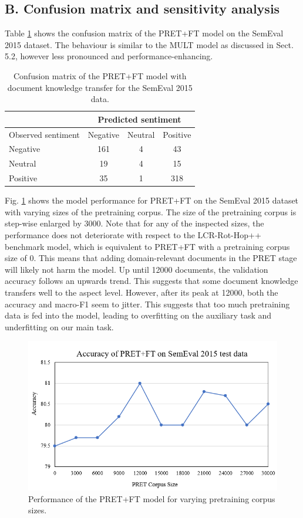 \subsection*{B. Confusion matrix and sensitivity analysis}
\renewcommand{\thefigure}{B\arabic{figure}}
\setcounter{figure}{0}
\renewcommand{\thetable}{B\arabic{table}}
\setcounter{table}{0}

Table \ref{tab:confusion matrix:pret} shows the confusion matrix of the PRET+FT model on the SemEval 2015 dataset. The behaviour is similar to the MULT model as discussed in Sect. 5.2, however less pronounced and performance-enhancing.
\begin{table}[h!]
\caption{Confusion matrix of the PRET+FT model with document knowledge transfer for the SemEval 2015 data.}
\label{tab:confusion matrix:pret}
\setlength{\tabcolsep}{28.3pt}
\begin{tabular}{@{}lccc@{}}
\toprule
                   & \multicolumn{3}{c}{Predicted sentiment} \\ \midrule
 Observed sentiment & Negative     & Neutral    & Positive    \\ \midrule
 Negative           & 161          & 4          & 43          \\
 Neutral            & 19           & 4          & 15          \\
 Positive           & 35           & 1          & 318         \\ \bottomrule
 \end{tabular}
 \end{table}
 
 Fig. \ref{fig:pret+ft} shows the model performance for PRET+FT on the SemEval 2015 dataset with varying sizes of the pretraining corpus. The size of the pretraining corpus is step-wise enlarged by 3000. Note that for any of the inspected sizes, the performance does not deteriorate with respect to the LCR-Rot-Hop++ benchmark model, which is equivalent to PRET+FT with a pretraining corpus size of 0. This means that adding domain-relevant documents in the PRET stage will likely not harm the model. Up until 12000 documents, the validation accuracy follows an upwards trend. This suggests that some document knowledge transfers well to the aspect level. However, after its peak at 12000, both the accuracy and macro-F1 seem to jitter. This suggests that too much pretraining data is fed into the model, leading to overfitting on the auxiliary task and underfitting on our main task.
 
 \begin{figure}[h!]
    \centering
    \includegraphics[scale =0.8]{Images/PRET+FT.PNG}
    \caption{Performance of the PRET+FT model for varying pretraining corpus sizes.}
    \label{fig:pret+ft}
\end{figure}